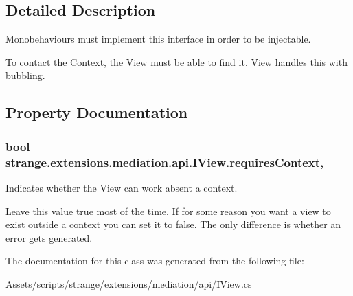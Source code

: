 \subsection{Detailed Description}
Monobehaviours must implement this interface in order to be injectable. 

To contact the Context, the View must be able to find it. View handles this with bubbling. 

\subsection{Property Documentation}
\hypertarget{interfacestrange_1_1extensions_1_1mediation_1_1api_1_1_i_view_a0d9c314f274cd64133a8c97116ba9332}{
\subsubsection[{requires\-Context}]{\setlength{\rightskip}{0pt plus 5cm}bool strange.\-extensions.\-mediation.\-api.\-I\-View.\-requires\-Context\hspace{0.3cm}{\ttfamily [get]}, {\ttfamily [set]}}}\label{interfacestrange_1_1extensions_1_1mediation_1_1api_1_1_i_view_a0d9c314f274cd64133a8c97116ba9332}


Indicates whether the View can work absent a context. 

Leave this value true most of the time. If for some reason you want a view to exist outside a context you can set it to false. The only difference is whether an error gets generated. 

The documentation for this class was generated from the following file\-:\begin{DoxyCompactItemize}
\item 
Assets/scripts/strange/extensions/mediation/api/I\-View.\-cs\end{DoxyCompactItemize}
